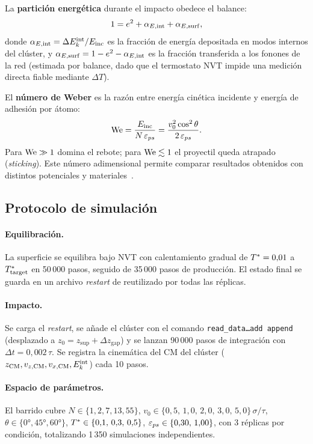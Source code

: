 La \textbf{partición energética} durante el impacto obedece el balance:
%
\begin{equation}
    1 = e^2 + \alpha_{E,\mathrm{int}} + \alpha_{E,\mathrm{surf}},
    \label{eq:balance}
\end{equation}
%
donde $\alpha_{E,\mathrm{int}} = \Delta E_k^{\mathrm{int}}/E_{\mathrm{inc}}$ es la fracción de energía depositada en
modos internos del clúster, y $\alpha_{E,\mathrm{surf}} = 1 - e^2 - \alpha_{E,\mathrm{int}}$ es la
fracción transferida a los fonones de la red (estimada por balance, dado que el
termostato NVT impide una medición directa fiable mediante $\Delta T$).

El \textbf{número de Weber} es la razón entre energía cinética incidente y
energía de adhesión por átomo:
%
\begin{equation}
    \mathrm{We} = \frac{E_{\mathrm{inc}}}{N\,\varepsilon_{ps}}
         = \frac{v_0^2\cos^2\theta}{2\,\varepsilon_{ps}}.
    \label{eq:weber}
\end{equation}
%
Para $\mathrm{We} \gg 1$ domina el rebote; para $\mathrm{We} \lesssim 1$ el proyectil queda
atrapado (\textit{sticking}). Este número adimensional permite comparar
resultados obtenidos con distintos potenciales y materiales~\cite{Dahneke1975,
Hou2000}.

\subsection{Protocolo de simulación}

\paragraph{Equilibración.} La superficie se equilibra bajo NVT con calentamiento
gradual de $T^{*} = 0{,}01$ a $T^{*}_{\mathrm{target}}$ en 50\,000 pasos,
seguido de 35\,000 pasos de producción. El estado final se guarda en un archivo
\textit{restart} de \lammps{} reutilizado por todas las réplicas.

\paragraph{Impacto.} Se carga el \textit{restart}, se añade el clúster con el
comando \texttt{read\_data\ldots add append} (desplazado a $z_0 = z_{\mathrm{sup}}
+ \Delta z_{\mathrm{gap}}$) y se lanzan 90\,000 pasos de integración con
$\Delta t = 0{,}002\,\tau$. Se registra la cinemática del CM del clúster
($z_{\mathrm{CM}}, v_{z,\mathrm{CM}}, v_{x,\mathrm{CM}}, E_k^{\mathrm{int}}$) cada 10 pasos.

\paragraph{Espacio de parámetros.} El barrido cubre
$N \in \{1, 2, 7, 13, 55\}$,
$v_0 \in \{0{,}5,\, 1{,}0,\, 2{,}0,\, 3{,}0,\, 5{,}0\}\,\sigma/\tau$,
$\theta \in \{0°, 45°, 60°\}$,
$T^{*} \in \{0{,}1,\, 0{,}3,\, 0{,}5\}$,
$\varepsilon_{ps} \in \{0{,}30,\, 1{,}00\}$,
con 3 réplicas por condición, totalizando 1\,350 simulaciones independientes.
